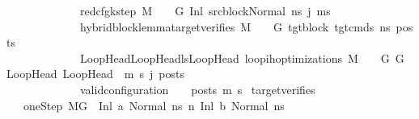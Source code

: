 \begin{isabellebody}
\ \ \ \ \ \ \ \ \ \ \ \ \ {\isacharparenleft}{\kern0pt}red{\isacharunderscore}{\kern0pt}cfg{\isacharunderscore}{\kern0pt}k{\isacharunderscore}{\kern0pt}step\ M\ {\isasymLambda}\ {\isasymGamma}\ {\isasymOmega}\ G\ {\isacharparenleft}{\kern0pt}{\isacharparenleft}{\kern0pt}Inl\ src{\isacharunderscore}{\kern0pt}block{\isacharparenright}{\kern0pt}{\isacharcomma}{\kern0pt}{\isacharparenleft}{\kern0pt}Normal\ ns{\isacharparenright}{\kern0pt}{\isacharparenright}{\kern0pt}\ j\ {\isacharparenleft}{\kern0pt}m{\isacharprime}{\kern0pt}{\isacharcomma}{\kern0pt}s{\isacharprime}{\kern0pt}{\isacharparenright}{\kern0pt}{\isacharparenright}{\kern0pt}\ {\isasymlongrightarrow}\isanewline
\ \ \ \ \ \ \ \ \ \ \ \ \ hybrid{\isacharunderscore}{\kern0pt}block{\isacharunderscore}{\kern0pt}lemma{\isacharunderscore}{\kern0pt}target{\isacharunderscore}{\kern0pt}verifies\ M\ {\isasymLambda}\ {\isasymGamma}\ {\isasymOmega}\ G{\isacharprime}{\kern0pt}\ tgt{\isacharunderscore}{\kern0pt}block\ tgt{\isacharunderscore}{\kern0pt}cmds\ ns\ posts\ {\isasymlongrightarrow}\isanewline
\ \ \ \ \ \ \ \ \ \ \ \ \ {\isacharparenleft}{\kern0pt}{\isasymforall}{\isacharparenleft}{\kern0pt}LoopHead{\isacharcomma}{\kern0pt}LoopHead{\isacharprime}{\kern0pt}{\isacharparenright}{\kern0pt}{\isasymin}lsLoopHead{\isachardot}{\kern0pt}\ loop{\isacharunderscore}{\kern0pt}ih{\isacharunderscore}{\kern0pt}optimizations\ M\ {\isasymLambda}\ {\isasymGamma}\ {\isasymOmega}\ G\ G{\isacharprime}{\kern0pt}\ LoopHead\ LoopHead{\isacharprime}{\kern0pt}\ \ m{\isacharprime}{\kern0pt}\ s{\isacharprime}{\kern0pt}\ j\ posts{\isacharparenright}{\kern0pt}\ {\isasymlongrightarrow}\isanewline
\ \ \ \ \ \ \ \ \ \ \ \ \ valid{\isacharunderscore}{\kern0pt}configuration\ {\isasymLambda}\ {\isasymGamma}\ {\isasymOmega}\ posts\ m{\isacharprime}{\kern0pt}\ s{\isacharprime}{\kern0pt}{\isachardoublequoteclose}%
\isadelimdocument
%
\endisadelimdocument
%
\isatagdocument
%
\isamarkuptrue%
%
\endisatagdocument
{\isafolddocument}%
%
\isadelimdocument
%
\endisadelimdocument
{}\isamarkupfalse%
\ target{\isacharunderscore}{\kern0pt}verifies{\isacharcolon}{\kern0pt}\ \isanewline
\ \ \ oneStep{\isacharcolon}{\kern0pt}\ {\isachardoublequoteopen}M{\isacharcomma}{\kern0pt}{\isasymLambda}{\isacharcomma}{\kern0pt}{\isasymGamma}{\isacharcomma}{\kern0pt}{\isasymOmega}{\isacharcomma}{\kern0pt}G\ {\isasymturnstile}\ {\isacharparenleft}{\kern0pt}Inl\ a{\isacharcomma}{\kern0pt}\ Normal\ ns{\isacharparenright}{\kern0pt}\ {\isacharminus}{\kern0pt}n{\isasymrightarrow}\ {\isacharparenleft}{\kern0pt}Inl\ b{\isacharcomma}{\kern0pt}\ Normal\ ns{\isacharprime}{\kern0pt}{\isacharparenright}{\kern0pt}{\isachardoublequoteclose}\isanewline

\end{isabellebody}
